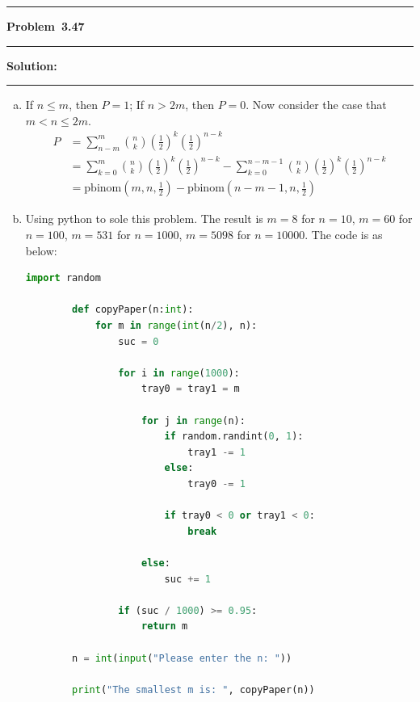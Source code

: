 \documentclass[10.5pt]{article}
\newcommand\question[1]{\vspace{.2in}\hrule\vspace{0.04in}\textbf{Problem\ #1}\vspace{.4em}\hrule\vspace{.10in}}
\newcommand\Solution{\vspace{.3in}\textbf{Solution:}\vspace{.5em}\hrule\vspace{.08in}\par}
\begin{document}
\question{3.47}
\Solution{}
\begin{enumerate}[(a)]
	\item If $n\leqslant m$, then $P = 1$; If $n > 2m$, then $P = 0$. Now consider the case that $m < n \leqslant 2m$.
	\begin{align*}
		P 
		&= \sum_{n - m}^m \binom{n}{k}\left(\frac{1}{2}\right)^k\left(\frac{1}{2}\right)^{n - k}\\[6pt]
		&=\sum_{k = 0}^{m} \binom{n}{k}\left(\frac{1}{2}\right)^k\left(\frac{1}{2}\right)^{n - k} - \sum_{k = 0}^{n - m - 1} \binom{n}{k}\left(\frac{1}{2}\right)^k\left(\frac{1}{2}\right)^{n - k}\\[6pt]
		&=\text{pbinom}(m, n, \frac{1}{2}) - \text{pbinom}(n - m - 1, n, \frac{1}{2})
	\end{align*}
	\item Using python to sole this problem. The result is $m = 8$ for $n = 10$, $m = 60$ for $n = 100$, $m = 531$ for $n = 1000$, $m = 5098$ for $n = 10000$.
	The code is as below:
	\begin{lstlisting}[language = python]
		import random

		def copyPaper(n:int):
			for m in range(int(n/2), n):
				suc = 0
				
				for i in range(1000):
					tray0 = tray1 = m
		
					for j in range(n):
						if random.randint(0, 1):
							tray1 -= 1
						else:
							tray0 -= 1
		
						if tray0 < 0 or tray1 < 0:
							break
					
					else:
						suc += 1
		
				if (suc / 1000) >= 0.95:
					return m
			
		n = int(input("Please enter the n: "))
		
		print("The smallest m is: ", copyPaper(n))
	\end{lstlisting}
\end{enumerate}
\end{document}
